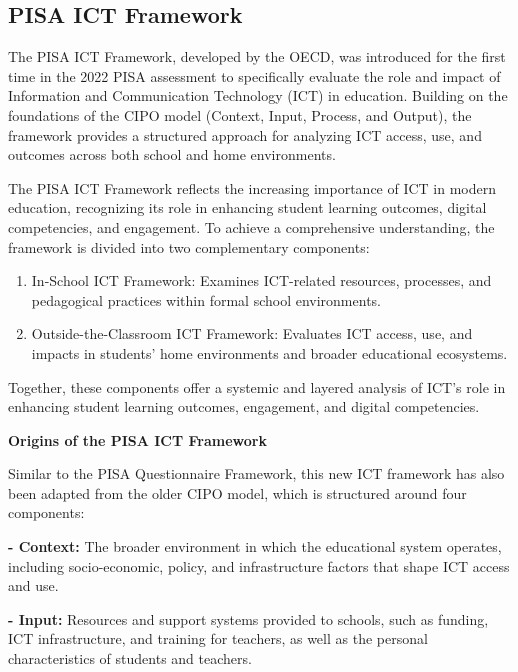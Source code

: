 \documentclass[
]{article}
\begin{document}
\hypertarget{pisa-ict-framework}{%
\subsection{PISA ICT Framework}\label{pisa-ict-framework}}

The PISA ICT Framework, developed by the OECD, was introduced for the
first time in the 2022 PISA assessment to specifically evaluate the role
and impact of Information and Communication Technology (ICT) in
education. Building on the foundations of the CIPO model (Context,
Input, Process, and Output), the framework provides a structured
approach for analyzing ICT access, use, and outcomes across both school
and home environments.

The PISA ICT Framework reflects the increasing importance of ICT in
modern education, recognizing its role in enhancing student learning
outcomes, digital competencies, and engagement. To achieve a
comprehensive understanding, the framework is divided into two
complementary components:

\begin{enumerate}
\def\labelenumi{\arabic{enumi}.}
\item
  In-School ICT Framework: Examines ICT-related resources, processes,
  and pedagogical practices within formal school environments.
\item
  Outside-the-Classroom ICT Framework: Evaluates ICT access, use, and
  impacts in students' home environments and broader educational
  ecosystems.
\end{enumerate}

Together, these components offer a systemic and layered analysis of
ICT's role in enhancing student learning outcomes, engagement, and
digital competencies.

\textbf{Origins of the PISA ICT Framework}

Similar to the PISA Questionnaire Framework, this new ICT framework has
also been adapted from the older CIPO model, which is structured around
four components:

\textbf{- Context:} The broader environment in which the educational
system operates, including socio-economic, policy, and infrastructure
factors that shape ICT access and use.

\textbf{- Input:} Resources and support systems provided to schools,
such as funding, ICT infrastructure, and training for teachers, as well
as the personal characteristics of students and teachers.
\end{document}

